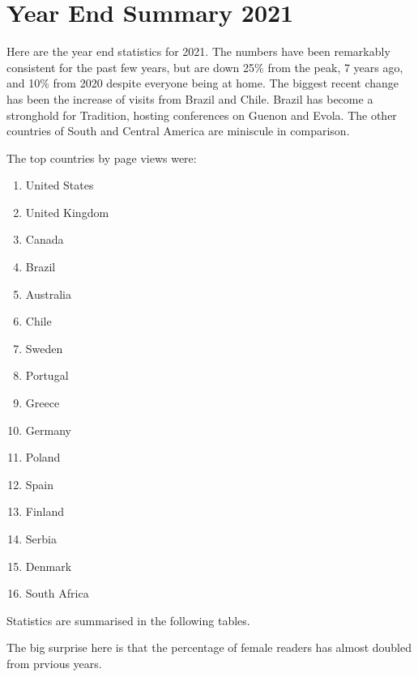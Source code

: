 \section{Year End Summary 2021}

Here are the year end statistics for 2021. The numbers have been remarkably consistent for the past few years, but are down 25\% from the peak, 7 years ago, and 10\% from 2020 despite everyone being at home. The biggest recent change has been the increase of visits from Brazil and Chile. Brazil has become a stronghold for Tradition, hosting conferences on Guenon and Evola. The other countries of South and Central America are miniscule in comparison.

The top countries by page views were:

\begin{enumerate}


\item United States

\item United Kingdom

\item Canada

\item Brazil

\item Australia

\item Chile

\item Sweden

\item Portugal

\item Greece

\item Germany

\item Poland

\item Spain

\item Finland

\item Serbia

\item Denmark

\item South Africa
\end{enumerate}


Statistics are summarised in the following tables.

The big surprise here is that the percentage of female readers has almost doubled from prvious years.

